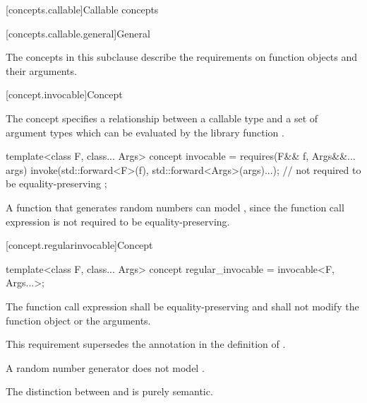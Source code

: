 [concepts.callable]{Callable concepts}

[concepts.callable.general]{General}

\pnum
The concepts in this subclause describe the requirements on function
objects and their arguments.

[concept.invocable]{Concept }

\pnum
The  concept specifies a relationship between a callable
type  and a set of argument types  which
can be evaluated by the library function .

%
\begin{itemdecl}
template<class F, class... Args>
  concept invocable = requires(F&& f, Args&&... args) {
    invoke(std::forward<F>(f), std::forward<Args>(args)...); // not required to be equality-preserving
  };
\end{itemdecl}

\begin{itemdescr}
\pnum
\begin{example}
A function that generates random numbers can model ,
since the  function call expression is not required to be
equality-preserving.
\end{example}
\end{itemdescr}

[concept.regularinvocable]{Concept }

%
\begin{itemdecl}
template<class F, class... Args>
  concept regular_invocable = invocable<F, Args...>;
\end{itemdecl}

\begin{itemdescr}
\pnum
The  function call expression shall be equality-preserving and
shall not modify the function object or the
arguments.
\begin{note}
This requirement supersedes the annotation in the definition of
.
\end{note}

\pnum
\begin{example}
A random number generator does not model .
\end{example}

\pnum
\begin{note}
The distinction between  and 
is purely semantic.
\end{note}
\end{itemdescr}

